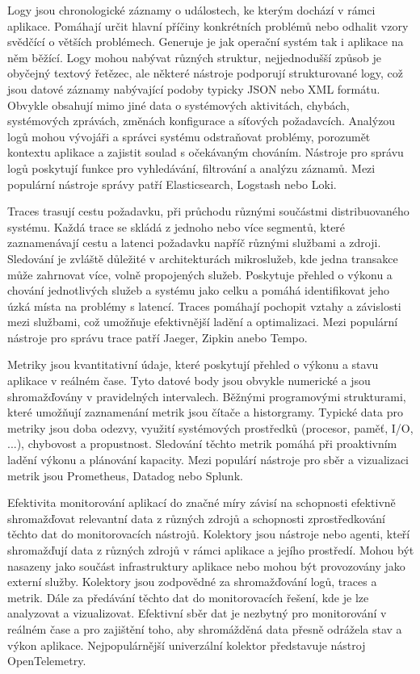 
Logy jsou chronologické záznamy o událostech, ke kterým dochází v rámci aplikace. Pomáhají určit hlavní příčiny konkrétních problémů nebo odhalit vzory svědčící o větších problémech. Generuje je jak operační systém tak i aplikace na něm běžící. Logy mohou nabývat různých struktur, nejjednodušší způsob je obyčejný textový řetězec, ale některé nástroje podporují strukturované logy, což jsou datové záznamy nabývající podoby typicky JSON nebo XML formátu. Obvykle obsahují mimo jiné data o systémových aktivitách, chybách, systémových zprávách, změnách konfigurace a síťových požadavcích. Analýzou logů mohou vývojáři a správci systému odstraňovat problémy, porozumět kontextu aplikace a zajistit soulad s očekávaným chováním. Nástroje pro správu logů poskytují funkce pro vyhledávání, filtrování a analýzu záznamů. Mezi populární nástroje správy patří Elasticsearch, Logstash nebo Loki.


Traces trasují cestu požadavku, při průchodu různými součástmi distribuovaného systému. Každá trace se skládá z jednoho nebo více segmentů, které zaznamenávají cestu a latenci požadavku napříč různými službami a zdroji. Sledování je zvláště důležité v architekturách mikroslužeb, kde jedna transakce může zahrnovat více, volně propojených služeb. Poskytuje přehled o výkonu a chování jednotlivých služeb a systému jako celku a pomáhá identifikovat jeho úzká místa na problémy s latencí. Traces pomáhají pochopit vztahy a závislosti mezi službami, což umožňuje efektivnější ladění a optimalizaci. Mezi populární nástroje pro správu trace patří Jaeger, Zipkin anebo Tempo.


Metriky jsou kvantitativní údaje, které poskytují přehled o výkonu a stavu aplikace v reálném čase. Tyto datové body jsou obvykle numerické a jsou shromažďovány v pravidelných intervalech. Běžnými programovými strukturami, které umožňují zaznamenání metrik jsou čítače a historgramy. Typické data pro metriky jsou doba odezvy, využití systémových prostředků (procesor, paměť, I/O, ...), chybovost a propustnost. Sledování těchto metrik pomáhá při proaktivním ladění výkonu a plánování kapacity. Mezi populárí nástroje pro sběr a vizualizaci metrik jsou Prometheus, Datadog nebo Splunk.


Efektivita monitorování aplikací do značné míry závisí na schopnosti efektivně shromažďovat relevantní data z různých zdrojů a schopnosti zprostředkování těchto dat do monitorovacích nástrojů. Kolektory jsou nástroje nebo agenti, kteří shromažďují data z různých zdrojů v rámci aplikace a jejího prostředí. Mohou být nasazeny jako součást infrastruktury aplikace nebo mohou být provozovány jako externí služby. Kolektory jsou zodpovědné za shromažďování logů, traces a metrik. Dále za předávání těchto dat do monitorovacích řešení, kde je lze analyzovat a vizualizovat. Efektivní sběr dat je nezbytný pro monitorování v reálném čase a pro zajištění toho, aby shromážděná data přesně odrážela stav a výkon aplikace. Nejpopulárnější univerzální kolektor představuje nástroj OpenTelemetry.

